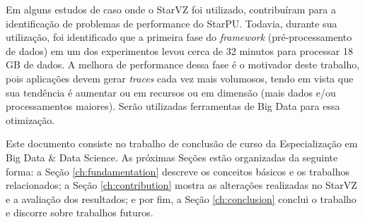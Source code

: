 Em alguns estudos de caso onde o StarVZ foi utilizado, contribuíram para a identificação de problemas de performance do StarPU. Todavia, durante sua utilização, foi identificado que a primeira fase do \emph{framework} (pré-processamento de dados) em um dos experimentos levou cerca de 32 minutos para processar 18 GB de dados. A melhora de performance dessa fase é o motivador deste trabalho, pois aplicações devem gerar \emph{traces} cada vez mais volumosos, tendo em vista que sua tendência é aumentar ou em recursos ou em dimensão (mais dados e/ou processamentos maiores). Serão utilizadas ferramentas de Big Data para essa otimização.

Este documento consiste no trabalho de conclusão de curso da Especialização em Big Data \& Data Science. As próximas Seções estão organizadas da seguinte forma: a Seção \ref{ch:fundamentation} descreve os conceitos básicos e os trabalhos relacionados; a Seção \ref{ch:contribution} mostra as alterações realizadas no StarVZ e a avaliação dos resultados; e por fim, a Seção \ref{ch:conclusion} conclui o trabalho e discorre sobre trabalhos futuros.